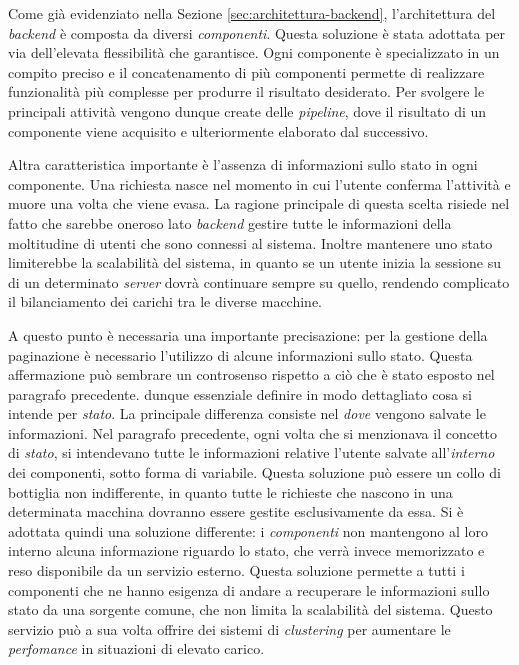 Come già evidenziato nella Sezione \ref{sec:architettura-backend}, l'architettura del \emph{backend} è composta da diversi \emph{componenti}. Questa soluzione è stata adottata per via dell'elevata flessibilità che garantisce. Ogni componente è specializzato in un compito preciso e il concatenamento di più componenti permette di realizzare funzionalità più complesse per produrre il risultato desiderato. Per svolgere le principali attività vengono dunque create delle \emph{pipeline}, dove il risultato di un componente viene acquisito e ulteriormente elaborato dal successivo.

Altra caratteristica importante è l'assenza di informazioni sullo stato in ogni componente. Una richiesta nasce nel momento in cui l'utente conferma l'attività e muore una volta che viene evasa. La ragione principale di questa scelta risiede nel fatto che sarebbe oneroso lato \emph{backend} gestire tutte le informazioni della moltitudine di utenti che sono connessi al sistema. Inoltre mantenere uno stato limiterebbe la scalabilità del sistema, in quanto se un utente inizia la sessione su di un determinato \emph{server} dovrà continuare sempre su quello, rendendo complicato il bilanciamento dei carichi tra le diverse macchine.

A questo punto è necessaria una importante precisazione: per la gestione della paginazione è necessario l'utilizzo di alcune informazioni sullo stato. Questa affermazione può sembrare un controsenso rispetto a ciò che è stato esposto nel paragrafo precedente. \upe dunque essenziale definire in modo dettagliato cosa si intende per \emph{stato}. La principale differenza consiste nel \emph{dove} vengono salvate le informazioni. Nel paragrafo precedente, ogni volta che si menzionava il concetto di \emph{stato}, si intendevano tutte le informazioni relative l'utente salvate all'\emph{interno} dei componenti, sotto forma di variabile. Questa soluzione può essere un collo di bottiglia non indifferente, in quanto tutte le richieste che nascono in una determinata macchina dovranno essere gestite esclusivamente da essa. Si è adottata quindi una soluzione differente: i \emph{componenti} non mantengono al loro interno alcuna informazione riguardo lo stato, che verrà invece memorizzato e reso disponibile da un servizio esterno. Questa soluzione permette a tutti i componenti che ne hanno esigenza di andare a recuperare le informazioni sullo stato da una sorgente comune, che non limita la scalabilità del sistema. Questo servizio può a sua volta offrire dei sistemi di \emph{clustering} per aumentare le \emph{perfomance} in situazioni di elevato carico.

